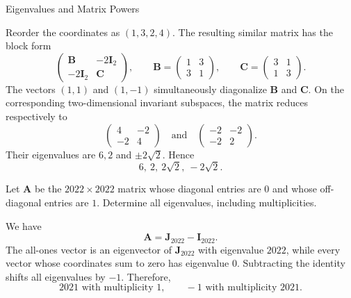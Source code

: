 \begin{expectedproblemgroup}{Eigenvalues and Matrix Powers}
        \begin{expectedsubsolution}
            Reorder the coordinates as $(1,3,2,4)$. The resulting similar
            matrix has the block form
            \[
                \begin{pmatrix}
                    \mathbf{B} & -2\mathbf{I}_2\\
                    -2\mathbf{I}_2 & \mathbf{C}
                \end{pmatrix},
                \qquad
                \mathbf{B}
                =
                \begin{pmatrix}
                    1&3\\3&1
                \end{pmatrix},
                \qquad
                \mathbf{C}
                =
                \begin{pmatrix}
                    3&1\\1&3
                \end{pmatrix}.
            \]
            The vectors $(1,1)$ and $(1,-1)$ simultaneously diagonalize
            $\mathbf{B}$ and $\mathbf{C}$. On the corresponding two-dimensional
            invariant subspaces, the matrix reduces respectively to
            \[
                \begin{pmatrix}
                    4&-2\\-2&4
                \end{pmatrix}
                \quad\text{and}\quad
                \begin{pmatrix}
                    -2&-2\\-2&2
                \end{pmatrix}.
            \]
            Their eigenvalues are $6,2$ and $\pm2\sqrt2$. Hence
            \[
                \boxed{6,\ 2,\ 2\sqrt2,\ -2\sqrt2}.
            \]
        \end{expectedsubsolution}

        \begin{expectedsubproblem}
            Let $\mathbf{A}$ be the $2022\times2022$ matrix whose diagonal
            entries are $0$ and whose off-diagonal entries are $1$. Determine
            all eigenvalues, including multiplicities.
        \end{expectedsubproblem}

        \begin{expectedsubsolution}
            We have
            \[
                \mathbf{A}=\mathbf{J}_{2022}-\mathbf{I}_{2022}.
            \]
            The all-ones vector is an eigenvector of $\mathbf{J}_{2022}$ with
            eigenvalue $2022$, while every vector whose coordinates sum to zero
            has eigenvalue $0$. Subtracting the identity shifts all eigenvalues
            by $-1$. Therefore,
            \[
                \boxed{
                    2021\text{ with multiplicity }1,
                    \qquad
                    -1\text{ with multiplicity }2021
                }.
            \]
        \end{expectedsubsolution}



\end{expectedproblemgroup}
